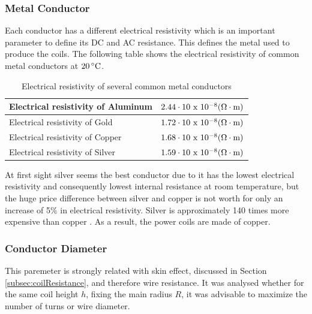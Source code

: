				\subsubsection{Metal Conductor}
Each conductor has a different electrical resistivity which is an important parameter to define its DC and AC resistance. This defines the metal used to produce the coils. The following table shows the electrical resistivity of common metal conductors at $20\,^{\circ}{\rm C}$.

\begin{table}[ht]
\begin{center}
\begin{tabular}{|l|c|}
\hline 
Electrical resistivity of Aluminum 	& \rule{0pt}{2ex} $2.44\cdot{10}\textnormal{ x }10^{-8}(\Omega\cdot\textnormal{m})$ \\ \hline
Electrical resistivity of Gold 		& \rule{0pt}{2ex} $1.72\cdot{10}\textnormal{ x }10^{-8}(\Omega\cdot\textnormal{m})$ \\ \hline 
Electrical resistivity of Copper 	& \rule{0pt}{2ex} $1.68\cdot{10}\textnormal{ x }10^{-8}(\Omega\cdot\textnormal{m})$ \\ \hline
Electrical resistivity of Silver	& \rule{0pt}{2ex} $1.59\cdot{10}\textnormal{ x }10^{-8}(\Omega\cdot\textnormal{m})$ \\ \hline
\end{tabular}
\caption{Electrical resistivity of several common metal conductors}
\label{T:electricalResistivity}
\end{center}
\end{table}


At first sight silver seems the best conductor due to it has the lowest electrical resistivity and consequently lowest internal resistance at room temperature, but the huge price difference between silver and copper is not worth for only an increase of 5$\%$ in electrical resistivity. Silver is approximately 140 times more expensive than copper \cite{terman1943radio}. As a result, the power coils are made of copper.



				\subsubsection{Conductor Diameter}\label{subsec:diameter} %
This paremeter is strongly related with skin effect, discussed in Section \ref{subsec:coilResistance}, and therefore wire resistance. It was analysed whether for the same coil height $h$, fixing the main radius $R$, it was advisable to maximize the number of turns or wire diameter.

